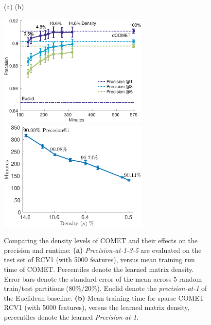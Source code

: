 \documentclass[twoside,11pt]{article}
\begin{document}
\begin{figure}[t]
   \captionsetup{font=small}
\caption{Comparing the density levels of COMET and their effects on the precision and runtime: \textbf{(a)} \textit{Precision-at-1-3-5} are evaluated on the test set of RCV1 (with 5000 features), versus mean training run time of COMET. Percentiles denote the learned matrix density. Error bars denote the standard error of the mean across 5 random train/test partitions (80\%/20\%). Euclid denote the \textit{precision-at-1} of the Euclidean baseline. \textbf{(b)} Mean training time for sparse COMET RCV1 (with 5000 features), versus the learned matrix density, percentiles denote the learned \textit{Precision-at-1}. }\label{spCometPrecTime}
   {
  \centering
    \centerline{
    (a) \hspace{200pt} (b) \hspace{90pt} \newline{}
    }
   \includegraphics[width=7.5cm]{sCOMET_precision_vs_runtime}
   \includegraphics[width=7.5cm]{runtime_vs_density}
   }
   \vskip -4pt
\end{figure}
\end{document}
